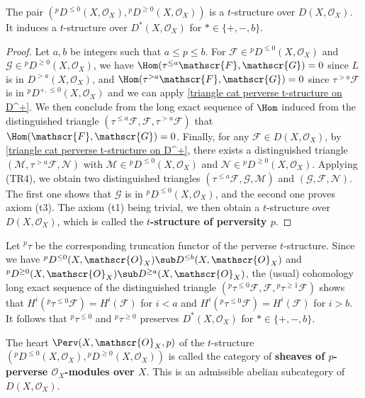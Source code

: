 \begin{corollary}\label{triangle cat perverse t-structure on D(X)}
The pair $({^pD^{\leq 0}}(X,\mathscr{O}_X),{^pD^{\geq 0}}(X,\mathscr{O}_X))$ is a $t$-structure over $D(X,\mathscr{O}_X)$. It induces a $t$-structure over $D^*(X,\mathscr{O}_X)$ for $*\in\{+,-,b\}$.
\end{corollary}
\begin{proof}
Let $a,b$ be integers such that $a\leq p\leq b$. For $\mathscr{F}\in {^pD^{\leq 0}}(X,\mathscr{O}_X)$ and $\mathscr{G}\in{^pD^{\geq 0}}(X,\mathscr{O}_X)$, we have $\Hom(\tau^{\leq a}\mathscr{F},\mathscr{G})=0$ since $L$ is in $D^{>a}(X,\mathscr{O}_X)$, and $\Hom(\tau^{>a}\mathscr{F},\mathscr{G})=0$ since $\tau^{>a}\mathscr{F}$ is in ${^pD^{+,\leq 0}}(X,\mathscr{O}_X)$ and we can apply \cref{triangle cat perverse t-structure on D^+}. We then conclude from the long exact sequence of $\Hom$ induced from the distinguished triangle $(\tau^{\leq a}\mathscr{F},\mathscr{F},\tau^{>a}\mathscr{F})$ that $\Hom(\mathscr{F},\mathscr{G})=0$. Finally, for any $\mathscr{F}\in D(X,\mathscr{O}_X)$, by \cref{triangle cat perverse t-structure on D^+}, there exists a distinguished triangle $(\mathscr{M},\tau^{>a}\mathscr{F},\mathscr{N})$ with $\mathscr{M}\in {^pD^{\leq 0}}(X,\mathscr{O}_X)$ and $\mathscr{N}\in {^pD^{\geq 0}}(X,\mathscr{O}_X)$. Applying (TR4), we obtain two distinguished triangles $(\tau^{\leq a}\mathscr{F},\mathscr{G},\mathscr{M})$ and $(\mathscr{G},\mathscr{F},\mathscr{N})$. The first one shows that $\mathscr{G}$ is in ${^pD^{\leq 0}}(X,\mathscr{O}_X)$, and the second one proves axiom (t3). The axiom (t1) being trivial, we then obtain a $t$-structure over $D(X,\mathscr{O}_X)$, which is called the \textbf{$t$-structure of perversity $p$}.
\end{proof}

Let ${^p}\tau$ be the corresponding truncation functor of the perverse $t$-structure. Since we have ${^pD^{\leq 0}}(X,\mathscr{O}_X)\sub D^{\leq b}(X,\mathscr{O}_X)$ and ${^pD^{\geq 0}}(X,\mathscr{O}_X)\sub D^{\geq a}(X,\mathscr{O}_X)$, the (usual) cohomology long exact sequence of the distinguished triangle $({^p\tau^{\leq 0}}\mathscr{F},\mathscr{F},{^p\tau^{\geq 1}}\mathscr{F})$ shows that $H^i({^p\tau^{\leq 0}}\mathscr{F})=H^i(\mathscr{F})$ for $i<a$ and $H^i({^p\tau^{\leq 0}}\mathscr{F})=H^i(\mathscr{F})$ for $i>b$. It follows that ${^p\tau^{\leq 0}}$ and ${^p\tau^{\geq 0}}$ preserves $D^*(X,\mathscr{O}_X)$ for $*\in\{+,-,b\}$.

\begin{definition}
The heart $\Perv(X,\mathscr{O}_X,p)$ of the $t$-structure $({^pD^{\leq 0}}(X,\mathscr{O}_X),{^pD^{\geq 0}}(X,\mathscr{O}_X))$ is called the category of \textbf{sheaves of $p$-perverse $\mathscr{O}_X$-modules over $X$}. This is an admissible abelian subcategory of $D(X,\mathscr{O}_X)$.
\end{definition}

